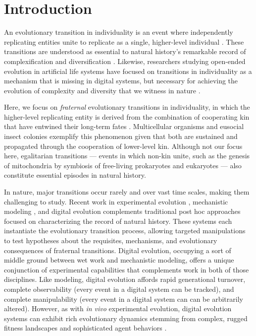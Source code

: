 \section{Introduction}

An evolutionary transition in individuality is an event where independently replicating entities unite to replicate as a single, higher-level individual \citep{smith1997major}.
These transitions are understood as essential to natural history's remarkable record of complexification and diversification \citep{smith1997major}.
Likewise, researchers studying open-ended evolution in artificial life systems have focused on transitions in individuality as a mechanism that is missing in digital systems, but necessary for achieving the evolution of complexity and diversity that we witness in nature \citep{taylor2016open, banzhaf2016defining}.

Here, we focus on \textit{fraternal} evolutionary transitions in individuality, in which the higher-level replicating entity is derived from the combination of cooperating kin that have entwined their long-term fates \citep{west2015major}.
Multicellular organisms and eusocial insect colonies exemplify this phenomenon \citep{smith1997major} given that both are sustained and propagated through the cooperation of lower-level kin.
Although not our focus here, egalitarian transitions --- events in which non-kin unite, such as the genesis of mitochondria by symbiosis of free-living prokaryotes and eukaryotes \citep{smith1997major} --- also constitute essential episodes in natural history.

In nature, major transitions occur rarely and over vast time scales, making them challenging to study.
Recent work in experimental evolution \citep{ratcliff2014experimental, ratcliff2015origins, gulli2019evolution, koschwanez2013improved}, mechanistic modeling \citep{hanschen2015evolutionary, staps2019emergence}, and digital evolution \citep{goldsby2012task, goldsby2014evolutionary} complements traditional post hoc approaches focused on characterizing the record of natural history.
These systems each instantiate the evolutionary transition process, allowing targeted manipulations to test hypotheses about the requisites, mechanisms, and evolutionary consequences of fraternal transitions.
Digital evolution, occupying a sort of middle ground between wet work and mechanistic modeling, offers a unique conjunction of experimental capabilities that complements work in both of those disciplines.
Like modeling, digital evolution affords rapid generational turnover, complete observability (every event in a digital system can be tracked), and complete manipulability (every event in a digital system can can be arbitrarily altered).
However, as with \textit{in vivo} experimental evolution, digital evolution systems can exhibit rich evolutionary dynamics stemming from complex, rugged fitness landscapes \citep{labar2017evolution} and sophisticated agent behaviors \citep{grabowski2013case}.

